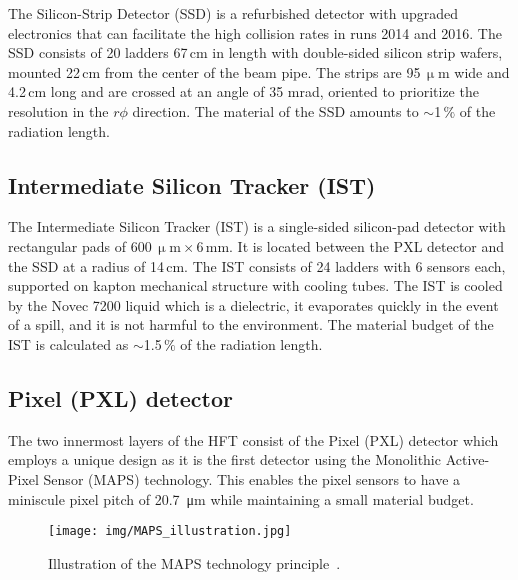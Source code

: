 The Silicon-Strip Detector (SSD) is a refurbished detector with upgraded electronics that can facilitate the high collision rates in runs 2014 and 2016\@. The SSD consists of 20 ladders 67$\,$cm in length with double-sided silicon strip wafers, mounted 22$\,$cm from the center of the beam pipe. The strips are 95$\,\upmu$m wide and 4.2$\,$cm long and are crossed at an angle of 35 mrad, oriented to prioritize the resolution in the $r\phi$ direction. The material of the SSD amounts to $\sim$1$\,\%$ of the radiation length.

\subsection{Intermediate Silicon Tracker (IST)\label{IstSection}}

The Intermediate Silicon Tracker (IST) is a single-sided silicon-pad detector with rectangular pads of $600\,\upmu\mathrm{m}\times6\,$mm. It is located between the PXL detector and the SSD at a radius of 14$\,$cm. The IST consists of 24 ladders with 6 sensors each, supported on kapton mechanical structure with cooling tubes. The IST is cooled by the Novec 7200 liquid which is a dielectric, it evaporates quickly in the event of a spill, and it is not harmful to the environment. The material budget of the IST is calculated as $\sim$1.5$\,\%$ of the radiation length.

\subsection{Pixel (PXL) detector}
The two innermost layers of the HFT consist of the Pixel (PXL) detector which employs a unique design as it is the
first detector using the Monolithic Active-Pixel Sensor (MAPS)
technology. This enables the pixel sensors to have a miniscule pixel pitch of \SI{20.7}{\micro\metre} while maintaining
a small material budget.

\begin{figure}[!htb]
\begin{center}
 \texttt{[image: img/MAPS\_illustration.jpg]}\\
\end{center}
\caption[Illustration of the MAPS technology principle.]{\label{MAPS}Illustration of the MAPS technology principle~\cite{MAPS_illustration}.}
\end{figure}

